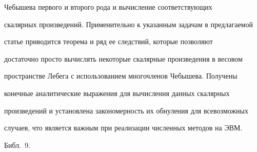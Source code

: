 Чебышева первого и второго рода и вычисление соответствующих 


скалярных произведений. Применительно к указанным задачам в предлагаемой 


статье приводится теорема и ряд ее следствий, которые позволяют 


достаточно просто вычислять некоторые скалярные произведения в весовом 


пространстве Лебега с использованием многочленов Чебышева. Получены 


конечные аналитические выражения для вычисления данных скалярных 


произведений и установлена закономерность их обнуления для всевозможных 


случаев, что является важным при реализации численных методов на ЭВМ.


Библ.~9.






















